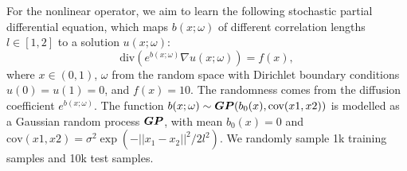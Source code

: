 \documentclass{article} %
\begin{document}
For the nonlinear operator, we aim to learn the following {stochastic partial differential equation}, which maps $b(x; \omega)$ of different correlation lengths $l\in[1,2]$ to a solution $u(x; \omega)$:
\begin{equation}
    \text{div} (e^{b(x;\omega)}\nabla u(x;\omega)) = f(x), 
\end{equation}
where $x \in (0, 1)$, 
$\omega$ from the random space 
with Dirichlet boundary conditions $u(0)=u(1)=0$, and $f(x)=10$. The randomness comes from the diffusion coefficient $e^{b(x;\omega)}$.  The function $b(x;\omega) \sim {\bm{G}}{\bm{P}}(b_0(x), \text{cov}(x1, x2))$ is modelled as a Gaussian random process ${\bm{G}}{\bm{P}}$, with mean $b_0(x)=0$ and $\text{cov}(x1,x2) = \sigma^2 \exp(-||x_1 -x_2||^2/2l^2)$.
We randomly sample 1k training samples and 10k test samples.

\begin{table}[t]
	\caption{Ablation studies on linear and nonlinear operators learning with synthetic data and depth estimation on NYU-Depth-v2. For operator learning, we report results as mean $\pm$ standard variance over 10 runs. 
    \textbf{Bold} numbers indicate the best performance.}
	\label{tab:depth_ablation}
	\centering
\end{table}
\end{document}
